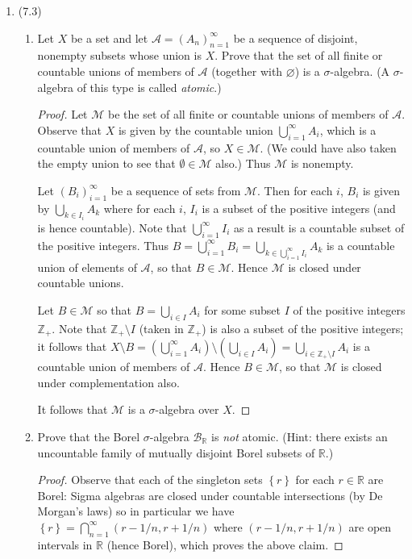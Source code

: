 \documentclass[11pt]{article}
\newcommand{\cbr}[1]{\left\{#1\right\}}
\begin{document}
\begin{enumerate}
\begin{enumerate}
\begin{proof}
        It follows that $\mathscr{M}$ is a $\sigma$-algebra over $X$.
      \end{proof}
    \end{enumerate}
    \item (7.3) \begin{enumerate}
        \item Let $X$ be a set and let $\mathscr{A} = (A_n)_{n=1}^\infty$ be a sequence of disjoint, nonempty subsets whose union is $X$. Prove that the set of all finite or countable unions of members of $\mathscr{A}$ (together with $\varnothing$) is a $\sigma$-algebra. (A $\sigma$-algebra of this type is called \textit{atomic}.) \begin{proof}
          Let $\mathscr{M}$ be the set of all finite or countable unions of members of $\mathscr{A}$. Observe that $X$ is given by the countable union $\bigcup_{i=1}^\infty A_i$, which is a countable union of members of $\mathscr{A}$, so $X\in \mathscr{M}$. (We could have also taken the empty union to see that $\emptyset\in\mathscr{M}$ also.) Thus $\mathscr{M}$ is nonempty.

          Let $(B_i)_{i=1}^\infty$ be a sequence of sets from $\mathscr{M}$. Then for each $i$, $B_i$ is given by $\bigcup_{k\in I_i}A_k$ where for each $i$, $I_i$ is a subset of the positive integers (and is hence countable). Note that $\bigcup_{i=1}^\infty I_i$ as a result is a countable subset of the positive integers. Thus $B = \bigcup_{i=1}^\infty B_i = \bigcup_{k\in \bigcup_{i=1}^\infty I_i} A_k$ is a countable union of elements of $\mathscr{A}$, so that $B\in\mathscr{M}$. Hence $\mathscr{M}$ is closed under countable unions.

          Let $B\in\mathscr{M}$ so that $B = \bigcup_{i\in I}A_i$ for some subset $I$ of the positive integers $\mathbb{Z}_+$. Note that $\mathbb{Z}_+\setminus I$ (taken in $\mathbb{Z}_+$) is also a subset of the positive integers; it follows that $X\setminus B = \left(\bigcup_{i=1}^\infty A_i\right)\setminus \left(\bigcup_{i\in I} A_i\right) = \bigcup_{i\in \mathbb{Z}_+\setminus I} A_i$ is a countable union of members of $\mathscr{A}$. Hence $B\in\mathscr{M}$, so that $\mathscr{M}$ is closed under complementation also.

          It follows that $\mathscr{M}$ is a $\sigma$-algebra over $X$.
        \end{proof}
        \item Prove that the Borel $\sigma$-algebra $\mathscr{B}_\mathbb{R}$ is \textit{not} atomic. (Hint: there exists an uncountable family of mutually disjoint Borel subsets of $\mathbb{R}$.) \begin{proof}
          Observe that each of the singleton sets $\cbr{r}$ for each $r\in\mathbb{R}$ are Borel: Sigma algebras are closed under countable intersections (by De Morgan's laws) so in particular we have $\cbr{r} = \bigcap_{n=1}^\infty (r-1/n, r+1/n)$ where $(r-1/n, r+1/n)$ are open intervals in $\mathbb{R}$ (hence Borel), which proves the above claim.


\end{proof}
\end{enumerate}
\end{enumerate}
\end{document}
